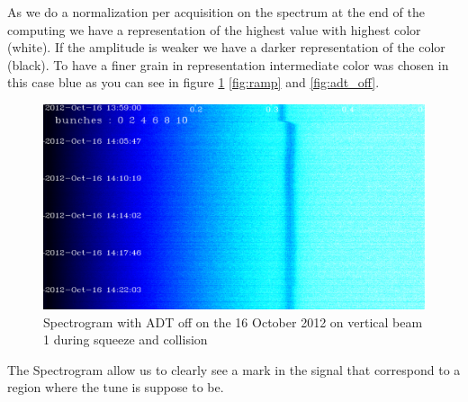 As we do a normalization per acquisition on the spectrum at the end of the computing we have a representation of the highest value with highest color (white). If the amplitude is weaker we have a darker representation of the color (black). To have a finer grain in representation intermediate color was chosen in this case blue as you can see in figure \ref{fig:squeeze} \ref{fig:ramp} and \ref{fig:adt_off}.

\begin{figure}[H]
\caption{Spectrogram with ADT off on the 16 October 2012 on vertical beam 1 during squeeze and collision}
\label{fig:squeeze}
\centering
\includegraphics[scale=0.3]{md-121016-vb1-m1-6bunches-10acc-1359-1425-collision.pdf}
\end{figure}

The Spectrogram allow us to clearly see a mark in the signal that correspond to a region where the tune is suppose to be.
